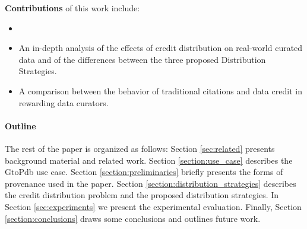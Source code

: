 \textbf{Contributions}
 of this work include:
\begin{itemize}
    \item {}
    \item An in-depth analysis of the effects of credit distribution on real-world curated data and of the differences between the three proposed Distribution Strategies.
    \item A comparison between the behavior of traditional citations and data credit in rewarding data curators.
\end{itemize}

\paragraph{\textbf{Outline}} The rest of the paper is organized as follows:
Section \ref{sec:related} presents background material and related work.   Section \ref{section:use_case} describes the GtoPdb use case. Section \ref{section:preliminaries} briefly presents the forms of provenance used in the paper.  Section \ref{section:distribution_strategies} describes the credit distribution problem and the proposed distribution strategies.  In Section \ref{sec:experiments} we present the experimental evaluation. Finally, Section \ref{section:conclusions} draws some conclusions and outlines future work.



 
